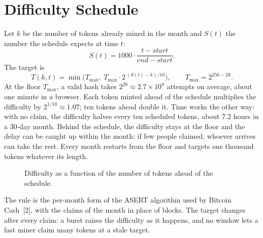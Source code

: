 \documentclass[10pt,letterpaper]{article}
\begin{document}
\section{Difficulty Schedule}\label{sec:difficulty}

Let $k$ be the number of tokens already mined in the month and $S(t)$ the number the schedule expects at time
$t$:
\[
  S(t) = 1000 \cdot \frac{t - \mathit{start}}{\mathit{end} - \mathit{start}} .
\]
The target is
\[
  T(k, t) = \min\!\Big(T_{\max},\ T_{\max} \cdot 2^{\,(S(t) - k)/10}\Big),
  \qquad T_{\max} = 2^{256-28}.
\]
At the floor $T_{\max}$, a valid hash takes $2^{28} \approx 2.7 \times 10^{8}$ attempts on average, about one minute
in a browser. Each token minted ahead of the schedule multiplies the difficulty by $2^{1/10} \approx 1.07$; ten
tokens ahead double it. Time works the other way: with no claim, the difficulty halves every ten scheduled tokens,
about 7.2 hours in a 30-day month. Behind the schedule, the difficulty stays at the floor and the delay can be
caught up within the month: if few people claimed, whoever arrives can take the rest. Every month restarts from
the floor and targets one thousand tokens whatever its length.

\begin{figure}[h]
\centering
{}
\caption*{\small Difficulty as a function of the number of tokens ahead of the schedule.}
\end{figure}

The rule is the per-month form of the ASERT algorithm used by Bitcoin Cash~[2], with the claims of the month in
place of blocks. The target changes after every claim: a burst raises the difficulty as it happens, and no window
lets a fast miner claim many tokens at a stale target.
\end{document}
